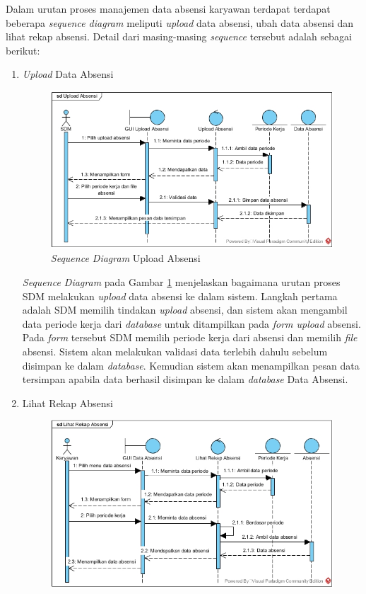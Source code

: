 \begin{enumerate}
            	Dalam urutan proses manajemen data absensi karyawan terdapat terdapat beberapa \emph{sequence diagram} meliputi \emph{upload} data absensi, ubah data absensi dan lihat rekap absensi. Detail dari masing-masing \emph{sequence} tersebut adalah sebagai berikut:
            	\begin{enumerate}[label=\alph*.]
            	    \itemsep0em
            	    \item \emph{Upload} Data Absensi
            	    \begin{figure}[H]
            		    \centering            		    \includegraphics[width=13cm]{gambar/sequence/upload-data-absensi}
            		    \caption{\emph{Sequence Diagram} Upload Absensi}
            		    \label{sequence_upload_absensi}
            		\end{figure}
            		\emph{Sequence Diagram} pada Gambar \ref{sequence_upload_absensi} menjelaskan bagaimana urutan proses SDM melakukan \emph{upload} data absensi ke dalam sistem. Langkah pertama adalah SDM memilih tindakan \emph{upload} absensi, dan sistem akan mengambil data periode kerja dari \emph{database} untuk ditampilkan pada \emph{form upload} absensi. Pada \emph{form} tersebut SDM memilih periode kerja dari absensi dan memilih \emph{file} absensi. Sistem akan melakukan validasi data terlebih dahulu sebelum disimpan ke dalam \emph{database}. Kemudian sistem akan menampilkan pesan data tersimpan apabila data berhasil disimpan ke dalam \emph{database} Data Absensi. \newpage
            	    \item Lihat Rekap Absensi
            	    \begin{figure}[H]
            		    \centering
            		    \includegraphics[width=13cm]{gambar/sequence/lihat-rekap-absensi}

\end{figure}
\end{enumerate}
\end{enumerate}
